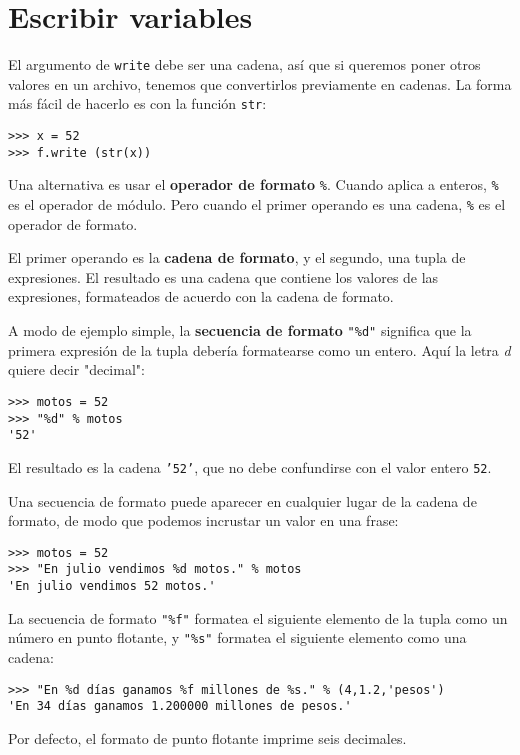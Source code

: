 \section{Escribir variables}

El argumento de \texttt{write} debe ser una cadena, así que si queremos
poner otros valores en un archivo, tenemos que convertirlos previamente en
cadenas. La forma más fácil de hacerlo es con la función \texttt{str}:

\beforeverb
\begin{verbatim}
>>> x = 52
>>> f.write (str(x))
\end{verbatim}
\afterverb
%
Una alternativa es usar el {\bf operador de formato} \texttt{\%}. Cuando
aplica a enteros, \texttt{\%} es el operador de módulo. Pero cuando el
primer operando es una cadena, \texttt{\%} es el operador de formato.

El primer operando es la {\bf cadena de formato}, y el segundo,
una tupla de expresiones. El resultado es una cadena que contiene los
valores de las expresiones, formateados de acuerdo con la cadena de formato.

A modo de ejemplo simple, la {\bf secuencia de formato} {\verb+"%d"+}
significa que la primera expresión de la tupla debería formatearse como
un entero. Aquí la letra {\em d} quiere decir "decimal":

\beforeverb
\begin{verbatim}
>>> motos = 52
>>> "%d" % motos
'52'
\end{verbatim}
\afterverb
%
El resultado es la cadena \texttt{'52'}, que no debe confundirse con el valor
entero \texttt{52}.

Una secuencia de formato puede aparecer en cualquier lugar de la cadena de
formato, de modo que podemos incrustar un valor en una frase:

\beforeverb
\begin{verbatim}
>>> motos = 52
>>> "En julio vendimos %d motos." % motos
'En julio vendimos 52 motos.'
\end{verbatim}
\afterverb
%
La secuencia de formato {\verb+"%f"+} formatea el siguiente elemento
de la tupla como un número en punto flotante, y {\verb+"%s"+} formatea
el siguiente elemento como una cadena:

\beforeverb
\begin{verbatim}
>>> "En %d días ganamos %f millones de %s." % (4,1.2,'pesos')
'En 34 días ganamos 1.200000 millones de pesos.'
\end{verbatim}
\afterverb
%
Por defecto, el formato de punto flotante imprime seis decimales.

